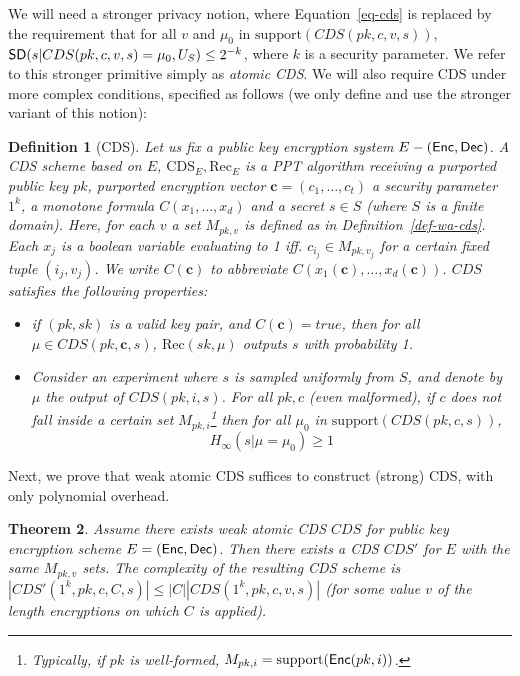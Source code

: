 \documentclass[11pt]{article}
\newtheorem{theorem}{Theorem}[section]{}
\newtheorem{definition}[theorem]{Definition}
\newcommand{\SD}{{\sf SD }}
\newcommand{\enc}{{\sf Enc}}
\newcommand{\dec}{{\sf Dec}}
\newcommand{\support}{{\mathrm{support}}}
\begin{document}
We will need a stronger privacy notion, where Equation~\ref{eq-cds} is replaced by the requirement that for all $v$ and $\mu_0$ in $\support(CDS(pk,c,v,s))$, $\SD(s|CDS(pk,c,v,s)=\mu_0,U_S)\leq 2^{-k}$, where $k$ is a security parameter. We refer to this stronger primitive simply as \emph{atomic CDS}. 
We will also require CDS under more complex conditions, specified as follows (we only define and use the stronger variant of this notion):

\begin{definition}[CDS]
	Let us fix a public key encryption system $E-(\enc,\dec)$. A CDS scheme based on $E$, $\text{CDS}_E,\text{Rec}_E$ is a PPT algorithm receiving a purported public key $pk$,
	purported encryption vector $\textbf{c}=(c_1,\ldots,c_t)$
	 a security parameter $1^k$, a monotone formula $C(x_1,\ldots,x_d)$ and a secret $s\in S$ (where $S$ is a finite domain). Here, for each $v$ a set $M_{pk,v}$ is defined as in Definition~\ref{def-wa-cds}.
	Each $x_j$ is a boolean variable evaluating to 1 iff.
	$c_{i_j}\in M_{pk,v_j}$ for a certain fixed tuple $(i_j,v_j)$. We
	write $C(\textbf{c})$ to abbreviate $C(x_1(\textbf{c}),\ldots,x_d(\textbf{c}))$.
	$CDS$ satisfies the following properties:
	\begin{itemize}
		\item[Correctness:] if $(pk,sk)$ is a valid key pair, and $C(\textbf{c})=true$, then for all $\mu \in CDS(pk,\textbf{c},s)$, $\text{Rec}(sk,\mu)$ outputs $s$ with probability 1.
		\item[Hiding:] Consider an experiment where $s$ is sampled uniformly from $S$, and denote by $\mu$ the output of $CDS(pk,i,s)$. For all $pk,c$ (even malformed), if $c$ does not fall inside a certain set $M_{pk,i}$\;\footnote{Typically, if $pk$ is well-formed, $M_{pk,i}=\support(\enc(pk,i))$.}  then for all $\mu_0$ in $\support(CDS(pk,c,s))$,	
		\begin{equation}\label{eq-cds}
		H_\infty(s|\mu = \mu_0)\geq 1
		\end{equation}
	\end{itemize}
\end{definition} 

Next, we prove that weak atomic CDS suffices to construct (strong) 
CDS, with only polynomial overhead.

\begin{theorem}\label{thm-wacds-cds}
	Assume there exists weak atomic CDS $CDS$ for public key encryption scheme $E=(\enc,\dec)$. Then there exists a CDS $CDS'$ for $E$ with the same $M_{pk,v}$ sets. The complexity of the resulting CDS scheme is $|CDS'(1^k,pk,c,C,s)|\leq |C||CDS(1^k,pk,c,v,s)|$ (for some value $v$ of the length encryptions on which $C$ is applied).
\end{theorem}
\end{document}
